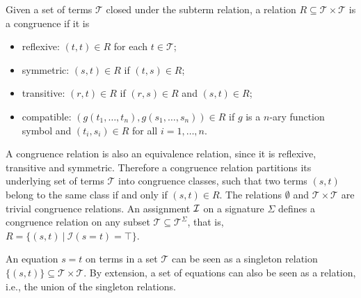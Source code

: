 \documentclass[smallextended]{svjour3}
\begin{document}
%
%
\begin{definition}  Given a set of terms $\mathcal{T}$ closed under the subterm relation, a relation $R \subseteq \mathcal{T} \times \mathcal{T}$ is a congruence if it is
\begin{itemize}
\item reflexive: $(t,t) \in R$ for each $t \in \mathcal{T}$;
\item symmetric: $(s,t) \in R$ if $(t,s) \in R$;
\item transitive:  $(r,t) \in R$ if $(r,s) \in R$ and $(s,t) \in R$;
\item compatible: $(g(t_1,\ldots,t_n),g(s_1,\ldots,s_n)) \in R$ if  $g$ is a $n$-ary function symbol and $(t_i,s_i) \in R$  for all $i = 1,\ldots,n$.
\end{itemize}

\end{definition}
\noindent A congruence relation is also an equivalence relation, since it is
reflexive, transitive and symmetric.  Therefore a congruence relation partitions
its underlying set of terms $\mathcal{T}$ into congruence classes, such that two
terms $(s,t)$ belong to the same class if and only if $(s,t) \in R$.  The
relations $\emptyset$ and $\mathcal{T} \times \mathcal{T}$ are trivial
congruence relations.  An assignment $\cal I$ on a signature $\Sigma$ defines a congruence relation on any subset $\mathcal{T}\subseteq\mathcal{T}^\Sigma$, that is, $R = \{(s,t) \ |\ \mathcal{I}(s = t) = \top \}$.

An equation $s = t$ on terms in a set $\mathcal{T}$ can be seen as a singleton relation $\{(s,t)\} \subseteq \mathcal{T} \times \mathcal{T}$.  By extension, a set of equations can also be seen as a relation, i.e., the union of the singleton relations. 
\end{document}
